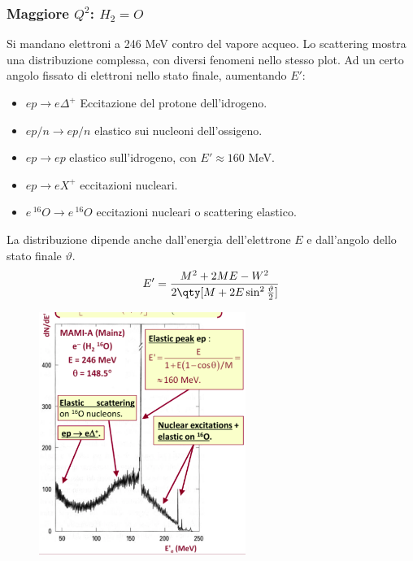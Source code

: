 \subsubsection{Maggiore $Q^2$: $H_2=O$}
Si mandano elettroni a 246 MeV contro del vapore acqueo. Lo scattering mostra una distribuzione complessa, con diversi fenomeni nello stesso plot. Ad un certo angolo fissato di elettroni nello stato finale, aumentando $E'$:
\begin{itemize}
    \item $ep\to e\Delta^+$ Eccitazione del protone dell'idrogeno.
    \item $ep/n\to ep/n$ elastico sui nucleoni dell'ossigeno.
    \item $ep\to ep$ elastico sull'idrogeno, con $E'\approx160$ MeV.
    \item $ep\to eX^+$ eccitazioni nucleari.
    \item $e\,^{16}O\to e\,^{16}O$ eccitazioni nucleari o scattering elastico.
\end{itemize}
La distribuzione dipende anche dall'energia dell'elettrone $E$ e dall'angolo dello stato finale $\vartheta$.
\begin{equation*}
    E'=\frac{M^2+2ME-W^2}{2\qty[M+2E\sin^2\frac\vartheta2]}
\end{equation*}
\begin{figure}[H]
    \centering
    \includegraphics[width=0.6\textwidth]{immagini/fig_higher_q2_water.png}
\end{figure}
